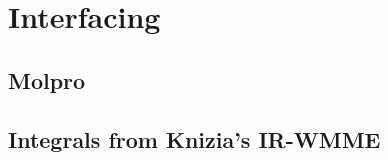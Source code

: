 \hypertarget{chap:interfacing}{}
\chapter{Interfacing}
\label{sec:interfacing}
\chapterauthor{}



\section{Molpro}


\section{Integrals from Knizia's IR-WMME}





